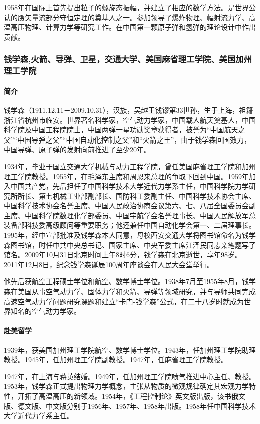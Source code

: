 \documentclass[UTF8]{ctexart}
\begin{document}
1958年在国际上首先提出粒子的螺旋态振幅，并建立了相应的数学方法。是世界公认的赝矢量流部分守恒定理的奠基人之一。参加领导了爆炸物理、幅射流力学、高温高压物理、计算力学等研究工作。在中国第一颗原子弹和氢弹的理论设计中作出贡献。
    \subsubsection{钱学森,火箭、导弹、卫星，交通大学、美国麻省理工学院、美国加州理工学院}

    \paragraph{简介}
钱学森（1911.12.11－2009.10.31），汉族，吴越王钱镠第33世孙，生于上海，祖籍浙江省杭州市临安。世界著名科学家，空气动力学家，中国载人航天奠基人，中国科学院及中国工程院院士，中国两弹一星功勋奖章获得者，被誉为“中国航天之父”“中国导弹之父”“中国自动化控制之父”和“火箭之王”，由于钱学森回国效力，中国导弹、原子弹的发射向前推进了至少20年。

1934年，毕业于国立交通大学机械与动力工程学院，曾任美国麻省理工学院和加州理工学院教授。1955年，在毛泽东主席和周恩来总理的争取下回到中国。1959年加入中国共产党，先后担任了中国科学技术大学近代力学系主任，中国科学院力学研究所所长、第七机械工业部副部长、国防科工委副主任、中国科学技术协会主席、中国科学技术协会名誉主席、中国人民政治协商会议第六、七、八届全国委员会副主席、中国科学院数理化学部委员、中国宇航学会名誉理事长、中国人民解放军总装备部科技委高级顾问等重要职务；他还兼任中国自动化学会第一、二届理事长。1995年，经中宣部批准及钱学森本人同意，母校西安交通大学将图书馆命名为钱学森图书馆，时任中共中央总书记、国家主席、中央军委主席江泽民同志亲笔题写了馆名。2009年10月31日北京时间上午8时6分，钱学森在北京逝世，享年98岁。 2011年12月8日，纪念钱学森诞辰100周年座谈会在人民大会堂举行。

他先后获航空工程硕士学位和航空、数学博士学位。1938年7月至1955年8月，钱学森在美国从事空气动力学、固体力学和火箭、导弹等领域研究，并与导师共同完成高速空气动力学问题研究课题和建立“卡门-钱学森”公式，在二十八岁时就成为世界知名的空气动力学家。
\paragraph{赴美留学}
1939年，获美国加州理工学院航空、数学博士学位。1943年，任加州理工学院助理教授。1945年，任加州理工学院副教授。1947年，任麻省理工学院教授。

1947年，在上海与蒋英结婚。1949年，任加州理工学院喷气推进中心主任、教授。1953年，钱学森正式提出物理力学概念，主张从物质的微观规律确定其宏观力学特性，开拓了高温高压的新领域。1954年，《工程控制论》英文版出版，该书俄文版、德文版、中文版分别于1956年、1957年、1958年出版。1958年任中国科学技术大学近代力学系主任。
\end{document}
